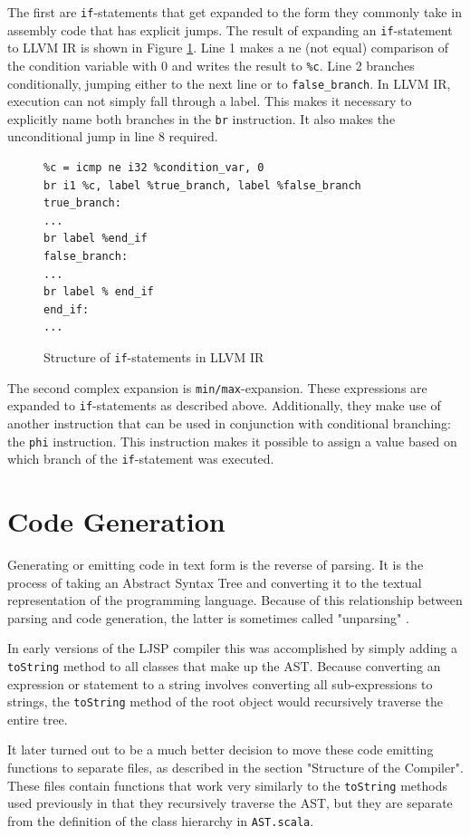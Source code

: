\documentclass[11pt]{report}
\begin{document}
The first are \texttt{if}-statements that get expanded to the form they commonly take in assembly code that has explicit jumps. The result of expanding an \texttt{if}-statement to LLVM IR is shown in Figure \ref{assemblyif}. Line 1 makes a ne (not equal) comparison of the condition variable with 0 and writes the result to \texttt{\%c}. Line 2 branches conditionally, jumping either to the next line or to \texttt{false_branch}. In LLVM IR, execution can not simply fall through a label. This makes it necessary to explicitly name both branches in the \texttt{br} instruction. It also makes the unconditional jump in line 8 required.

\begin{figure}[ht]
\begin{lstlisting}
%c = icmp ne i32 %condition_var, 0
br i1 %c, label %true_branch, label %false_branch
true_branch:
...
br label %end_if
false_branch:
...
br label % end_if
end_if:
...
\end{lstlisting}
\caption{Structure of \texttt{if}-statements in LLVM IR}
\label{assemblyif}
\end{figure}


The second complex expansion is \texttt{min/max}-expansion. These expressions are expanded to \texttt{if}-statements as described above. Additionally, they make use of another instruction that can be used in conjunction with conditional branching: the \texttt{phi} instruction. This instruction makes it possible to assign a value based on which branch of the \texttt{if}-statement was executed.


\section{Code Generation}
Generating or emitting code in text form is the reverse of parsing. It is the process of taking an Abstract Syntax Tree and converting it to the textual representation of the programming language. Because of this relationship between parsing and code generation, the latter is sometimes called "unparsing" \cite{Sarkar:2004:NIC:1016848.1016878}.

In early versions of the LJSP compiler this was accomplished by simply adding a \texttt{toString} method to all classes that make up the AST. Because converting an expression or statement to a string involves converting all sub-expressions to strings, the \texttt{toString} method of the root object would recursively traverse the entire tree.

It later turned out to be a much better decision to move these code emitting functions to separate files, as described in the section "Structure of the Compiler". These files contain functions that work very similarly to the \texttt{toString} methods used previously in that they recursively traverse the AST, but they are separate from the definition of the class hierarchy in \texttt{AST.scala}.
\end{document}
